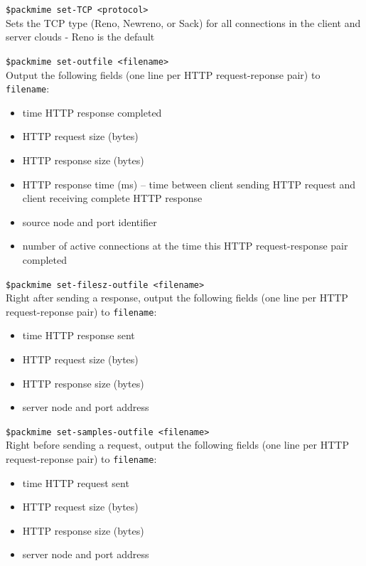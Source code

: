 {\tt \$packmime set-TCP <protocol>}\\
Sets the TCP type (Reno, Newreno, or Sack) for all connections in the
client and server clouds - Reno is the default

{\tt \$packmime set-outfile <filename>}\\
Output the following fields (one line per HTTP request-reponse pair)
to {\tt filename}:
\begin{itemize}
\item{time HTTP response completed}
\item{HTTP request size (bytes)}
\item{HTTP response size (bytes)}
\item{HTTP response time (ms) -- time between client sending HTTP
request and client receiving complete HTTP response} 
\item{source node and port identifier}
\item{number of active connections at the time this HTTP
request-response pair completed}
\end{itemize}

{\tt \$packmime set-filesz-outfile <filename>}\\
Right after sending a response, output the following fields (one line
per HTTP request-reponse pair) to {\tt filename}: 
\begin{itemize}
\item{time HTTP response sent}
\item{HTTP request size (bytes)}
\item{HTTP response size (bytes)}
\item{server node and port address}
\end{itemize}

{\tt \$packmime set-samples-outfile <filename>}\\
Right before sending a request, output the following fields (one line
per HTTP request-reponse pair) to {\tt filename}: 
\begin{itemize}
\item{time HTTP request sent}
\item{HTTP request size (bytes)}
\item{HTTP response size (bytes)}
\item{server node and port address}
\end{itemize}

